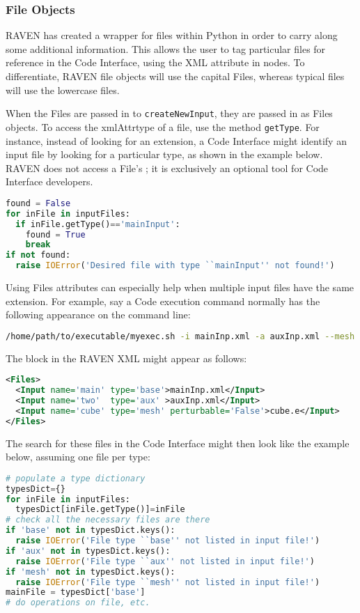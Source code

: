 \subsubsection{File Objects}
RAVEN has created a wrapper for files within Python in order to carry along some additional information.  This allows the user to tag particular files for reference in the Code Interface, using the  XML attribute in  nodes.  To differentiate, RAVEN file objects will use the capital Files, whereas typical files will use the lowercase files.

When the Files are passed in to \texttt{createNewInput}, they are passed in as Files objects. To access the xmlAttr{type} of a file, use the method \texttt{getType}.  For instance, instead of looking for an extension, a Code Interface might identify an input file by looking for a particular type, as shown in the example below. \nb RAVEN does not access a File's ; it is exclusively an optional tool for Code Interface developers.

\begin{lstlisting}[language=python,showstringspaces=false]
found = False
for inFile in inputFiles:
  if inFile.getType()=='mainInput':
    found = True
    break
if not found:
  raise IOError('Desired file with type ``mainInput'' not found!')
\end{lstlisting}
Using Files  attributes can especially help when multiple input files have the same extension.  For example, say a Code execution command normally has the following appearance on the command line:
\begin{lstlisting}[language=bash]
/home/path/to/executable/myexec.sh -i mainInp.xml -a auxInp.xml --mesh cube.e
\end{lstlisting}
The  block in the RAVEN XML might appear as follows:
\begin{lstlisting}[language=XML]
<Files>
  <Input name='main' type='base'>mainInp.xml</Input>
  <Input name='two'  type='aux' >auxInp.xml</Input>
  <Input name='cube' type='mesh' perturbable='False'>cube.e</Input>
</Files>
\end{lstlisting}
The search for these files in the Code Interface might then look like the example below, assuming one file per type:
\begin{lstlisting}[language=python,showstringspaces=false]
# populate a type dictionary
typesDict={}
for inFile in inputFiles:
  typesDict[inFile.getType()]=inFile
# check all the necessary files are there
if 'base' not in typesDict.keys():
  raise IOError('File type ``base'' not listed in input file!')
if 'aux' not in typesDict.keys():
  raise IOError('File type ``aux'' not listed in input file!')
if 'mesh' not in typesDict.keys():
  raise IOError('File type ``mesh'' not listed in input file!')
mainFile = typesDict['base']
# do operations on file, etc.
\end{lstlisting}


